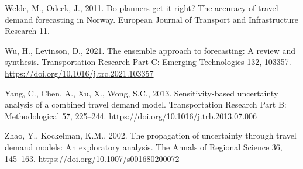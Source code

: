 \documentclass[
  futuretransp,
  submit,
  moreauthors,
]{Definitions/mdpi}
\newlength{\cslhangindent}
\newenvironment{CSLReferences}[2] %
 {\begin{list}{}{%
  \setlength{\itemindent}{0pt}
  \setlength{\leftmargin}{0pt}
  \setlength{\parsep}{0pt}
  \ifodd #1
   \setlength{\leftmargin}{\cslhangindent}
   \setlength{\itemindent}{-1\cslhangindent}
  \fi
  \setlength{\itemsep}{#2\baselineskip}}}
 {\end{list}}
\begin{document}
\begin{CSLReferences}{1}{0}
Welde, M., Odeck, J., 2011. Do planners get it right? {The} accuracy of
travel demand forecasting in {Norway}. European Journal of Transport and
Infrastructure Research 11.

Wu, H., Levinson, D., 2021. The ensemble approach to forecasting: {A}
review and synthesis. Transportation Research Part C: Emerging
Technologies 132, 103357.
\url{https://doi.org/10.1016/j.trc.2021.103357}

Yang, C., Chen, A., Xu, X., Wong, S.C., 2013. Sensitivity-based
uncertainty analysis of a combined travel demand model. Transportation
Research Part B: Methodological 57, 225--244.
\url{https://doi.org/10.1016/j.trb.2013.07.006}

Zhao, Y., Kockelman, K.M., 2002. The propagation of uncertainty through
travel demand models: {An} exploratory analysis. The Annals of Regional
Science 36, 145--163. \url{https://doi.org/10.1007/s001680200072}

\end{CSLReferences}










\PublishersNote{}
\end{document}
